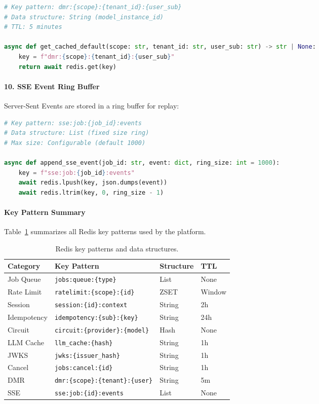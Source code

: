 \begin{lstlisting}[language=Python, caption={DMR caching.}]
# Key pattern: dmr:{scope}:{tenant_id}:{user_sub}
# Data structure: String (model_instance_id)
# TTL: 5 minutes

async def get_cached_default(scope: str, tenant_id: str, user_sub: str) -> str | None:
    key = f"dmr:{scope}:{tenant_id}:{user_sub}"
    return await redis.get(key)
\end{lstlisting}

\paragraph{10. SSE Event Ring Buffer}
Server-Sent Events are stored in a ring buffer for replay:

\begin{lstlisting}[language=Python, caption={SSE ring buffer implementation.}]
# Key pattern: sse:job:{job_id}:events
# Data structure: List (fixed size ring)
# Max size: Configurable (default 1000)

async def append_sse_event(job_id: str, event: dict, ring_size: int = 1000):
    key = f"sse:job:{job_id}:events"
    await redis.lpush(key, json.dumps(event))
    await redis.ltrim(key, 0, ring_size - 1)
\end{lstlisting}

\paragraph{Key Pattern Summary}
Table~\ref{tab:redis-keys} summarizes all Redis key patterns used by the platform.

\begin{table}[htbp]
    \centering
    \caption{Redis key patterns and data structures.}
    \label{tab:redis-keys}
    \small
    \begin{tabular}{llll}
        \toprule
        \textbf{Category} & \textbf{Key Pattern} & \textbf{Structure} & \textbf{TTL} \\
        \midrule
        Job Queue & \texttt{jobs:queue:\{type\}} & List & None \\
        Rate Limit & \texttt{ratelimit:\{scope\}:\{id\}} & ZSET & Window \\
        Session & \texttt{session:\{id\}:context} & String & 2h \\
        Idempotency & \texttt{idempotency:\{sub\}:\{key\}} & String & 24h \\
        Circuit & \texttt{circuit:\{provider\}:\{model\}} & Hash & None \\
        LLM Cache & \texttt{llm\_cache:\{hash\}} & String & 1h \\
        JWKS & \texttt{jwks:\{issuer\_hash\}} & String & 1h \\
        Cancel & \texttt{jobs:cancel:\{id\}} & String & 1h \\
        DMR & \texttt{dmr:\{scope\}:\{tenant\}:\{user\}} & String & 5m \\
        SSE & \texttt{sse:job:\{id\}:events} & List & None \\
        \bottomrule
    \end{tabular}
\end{table}

